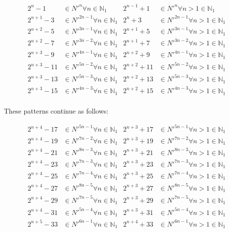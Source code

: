 \documentclass{article}
\begin{document}
\begin{displaymath}\begin{aligned}
2^n-1      & \in N'^n     \forall n \in \mathbb{N}_{1} & 2^{n-1}+1  & \in N'^n     \forall n>1 \in \mathbb{N}_{1} \\
2^{n+1}-3  & \in N'^{2n-1}\forall n \in \mathbb{N}_{1} & 2^n+3      & \in N'^{2n-1}\forall n>1 \in \mathbb{N}_{1} \\
2^{n+2}-5  & \in N'^{3n-1}\forall n \in \mathbb{N}_{1} & 2^{n+1}+5  & \in N'^{3n-1}\forall n>1 \in \mathbb{N}_{1} \\
2^{n+2}-7  & \in N'^{3n-2}\forall n \in \mathbb{N}_{1} & 2^{n+1}+7  & \in N'^{3n-2}\forall n>1 \in \mathbb{N}_{1} \\
2^{n+3}-9  & \in N'^{4n-1}\forall n \in \mathbb{N}_{1} & 2^{n+2}+9  & \in N'^{4n-1}\forall n>1 \in \mathbb{N}_{1} \\
2^{n+3}-11 & \in N'^{5n-2}\forall n \in \mathbb{N}_{1} & 2^{n+2}+11 & \in N'^{5n-2}\forall n>1 \in \mathbb{N}_{1} \\
2^{n+3}-13 & \in N'^{5n-3}\forall n \in \mathbb{N}_{1} & 2^{n+2}+13 & \in N'^{5n-3}\forall n>1 \in \mathbb{N}_{1} \\
2^{n+3}-15 & \in N'^{4n-3}\forall n \in \mathbb{N}_{1} & 2^{n+2}+15 & \in N'^{4n-3}\forall n>1 \in \mathbb{N}_{1} \\
\end{aligned}\end{displaymath}

\noindent
These patterns continue as follows:

\begin{displaymath}\begin{aligned}
2^{n+4}-17 & \in N'^{5n-1}\forall n \in \mathbb{N}_{1} & 2^{n+3}+17 & \in N'^{5n-1}\forall n>1 \in \mathbb{N}_{1} \\
2^{n+4}-19 & \in N'^{7n-2}\forall n \in \mathbb{N}_{1} & 2^{n+3}+19 & \in N'^{7n-2}\forall n>1 \in \mathbb{N}_{1} \\
2^{n+4}-21 & \in N'^{8n-3}\forall n \in \mathbb{N}_{1} & 2^{n+3}+21 & \in N'^{8n-3}\forall n>1 \in \mathbb{N}_{1} \\
2^{n+4}-23 & \in N'^{7n-3}\forall n \in \mathbb{N}_{1} & 2^{n+3}+23 & \in N'^{7n-3}\forall n>1 \in \mathbb{N}_{1} \\
2^{n+4}-25 & \in N'^{7n-4}\forall n \in \mathbb{N}_{1} & 2^{n+3}+25 & \in N'^{7n-4}\forall n>1 \in \mathbb{N}_{1} \\
2^{n+4}-27 & \in N'^{8n-5}\forall n \in \mathbb{N}_{1} & 2^{n+3}+27 & \in N'^{8n-5}\forall n>1 \in \mathbb{N}_{1} \\
2^{n+4}-29 & \in N'^{7n-5}\forall n \in \mathbb{N}_{1} & 2^{n+3}+29 & \in N'^{7n-5}\forall n>1 \in \mathbb{N}_{1} \\
2^{n+4}-31 & \in N'^{5n-4}\forall n \in \mathbb{N}_{1} & 2^{n+3}+31 & \in N'^{5n-4}\forall n>1 \in \mathbb{N}_{1} \\
2^{n+5}-33 & \in N'^{6n-1}\forall n \in \mathbb{N}_{1} & 2^{n+4}+33 & \in N'^{6n-1}\forall n>1 \in \mathbb{N}_{1} \\
\end{aligned}\end{displaymath}
\end{document}
